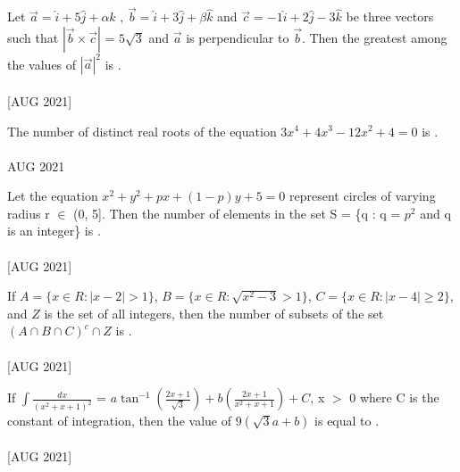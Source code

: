 \iffalse
  \title{Assignment}
  \author{ee24btech11030}
  \section{integer}
\fi

\item Let $\overset{\rightarrow}{a} = \hat{i} + 5\hat{j} + \alpha \hat{k}$ , $\overset{\rightarrow}{b} = \hat{i} + 3\hat{j} + \beta \hat{k}$ and $\overset{\rightarrow}{c} = -1\hat{i} + 2\hat{j} - 3\hat{k}$ be three vectors such that $|\overset{\rightarrow}{b} \times \overset{\rightarrow}{c}|$ = $5\sqrt{3}$ and
    $\overset{\rightarrow}{a}$ is perpendicular to $\overset{\rightarrow}{b}$. Then the greatest among the values of ${|\overset{\rightarrow}{a}|}^2$ is \underline{\hspace{1cm}}.\\\\\hfill{[AUG 2021]}
    \item The number of distinct real roots of the equation $3x^4 + 4x^3 - 12x^2 + 4 = 0$ is  \underline{\hspace{1cm}}. \\\\\hfill{AUG 2021}
    \item Let the equation $x^2 + y^2 + px + (1 - p)y + 5 = 0$ represent circles of varying radius r $\in$ (0, 5]. Then the number of elements in the set S = \{q : q = $p^2$ and q is an integer\} is \underline{\hspace{1cm}}. \\\\\hfill{[AUG 2021]}
    \item If $A = \{ x \in R : |x - 2| > 1 \}$, $B = \{ x \in R : \sqrt{x^2 - 3} > 1 \}$, $C = \{ x \in  R : |x - 4| \geq 2 \}$, and $Z$ is the set of all integers, then the number of subsets of the set $(A \cap B \cap C)^{c} \cap Z$ is \underline{\hspace{1cm}}. \\\\\hfill{[AUG 2021]}
    \item If $\int\frac{dx}{(x^2 + x +1)^{2}}$ = $a\tan^{-1}{\left(\frac{2x + 1}{\sqrt{3}}\right)} + b\left(\frac{2x + 1}{x^2 + x + 1}\right) + C$, x $>$ 0 where C is the constant of integration, then the value of $9(\sqrt{3}a + b)$ is equal to \underline{\hspace{1cm}}.\\\\\hfill{[AUG 2021]}
